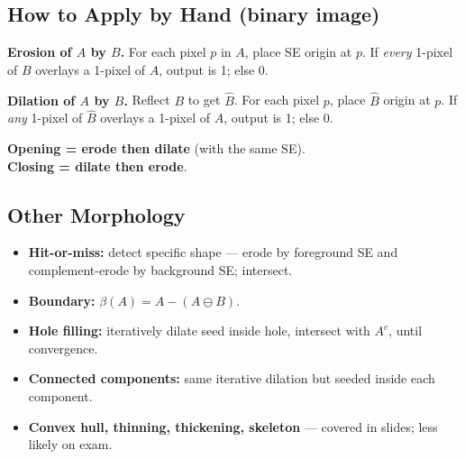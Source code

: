\documentclass[10pt]{article}
\begin{document}
\subsection{How to Apply by Hand (binary image)}
\begin{tcolorbox}[procbox]
\textbf{Erosion of $A$ by $B$.} For each pixel $p$ in $A$, place SE origin at $p$. If \emph{every} 1-pixel of $B$ overlays a 1-pixel of $A$, output is 1; else 0.

\textbf{Dilation of $A$ by $B$.} Reflect $B$ to get $\hat{B}$. For each pixel $p$, place $\hat{B}$ origin at $p$. If \emph{any} 1-pixel of $\hat{B}$ overlays a 1-pixel of $A$, output is 1; else 0.

\textbf{Opening = erode then dilate} (with the same SE).\\
\textbf{Closing = dilate then erode}.
\end{tcolorbox}

\subsection{Other Morphology}
\begin{itemize}
  \item \textbf{Hit-or-miss:} detect specific shape — erode by foreground SE and complement-erode by background SE; intersect.
  \item \textbf{Boundary:} $\beta(A) = A - (A\ominus B)$.
  \item \textbf{Hole filling:} iteratively dilate seed inside hole, intersect with $A^c$, until convergence.
  \item \textbf{Connected components:} same iterative dilation but seeded inside each component.
  \item \textbf{Convex hull, thinning, thickening, skeleton} — covered in slides; less likely on exam.
\end{itemize}
\end{document}
